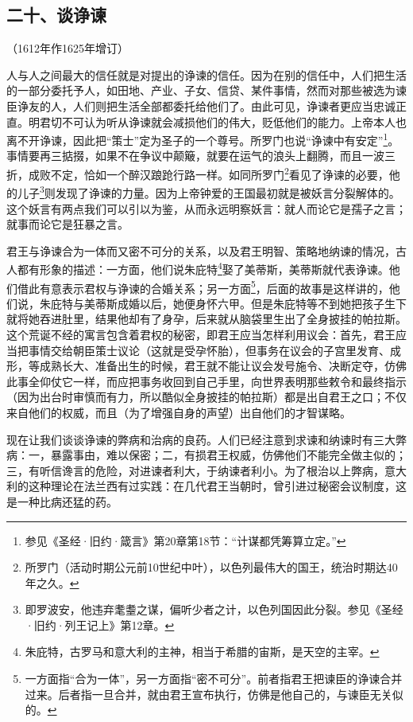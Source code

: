 \subsection*{二十、谈诤谏}
\begin{center}
    （1612年作1625年增订）
\end{center}
\par 人与人之间最大的信任就是对提出的诤谏的信任。因为在别的信任中，人们把生活的一部分委托予人，如田地、产业、子女、信贷、某件事情，然而对那些被选为谏臣诤友的人，人们则把生活全部都委托给他们了。由此可见，诤谏者更应当忠诚正直。明君切不可认为听从诤谏就会减损他们的伟大，贬低他们的能力。上帝本人也离不开诤谏，因此把“策士”定为圣子的一个尊号。所罗门也说“诤谏中有安定”\footnote{参见《圣经·旧约·箴言》第20章第18节：“计谋都凭筹算立定。”}。事情要再三掂掇，如果不在争议中颠簸，就要在运气的浪头上翻腾，而且一波三折，成败不定，恰如一个醉汉踉跄行路一样。如同所罗门\footnote{所罗门（活动时期公元前10世纪中叶），以色列最伟大的国王，统治时期达40年之久。}看见了诤谏的必要，他的儿子\footnote{即罗波安，他违弃耄耋之谋，偏听少者之计，以色列国因此分裂。参见《圣经·旧约·列王记上》第12章。}则发现了诤谏的力量。因为上帝钟爱的王国最初就是被妖言分裂解体的。这个妖言有两点我们可以引以为鉴，从而永远明察妖言：就人而论它是孺子之言；就事而论它是狂暴之言。
\par 君王与诤谏合为一体而又密不可分的关系，以及君王明智、策略地纳谏的情况，古人都有形象的描述：一方面，他们说朱庇特\footnote{朱庇特，古罗马和意大利的主神，相当于希腊的宙斯，是天空的主宰。}娶了美蒂斯，美蒂斯就代表诤谏。他们借此有意表示君权与诤谏的合婚关系；另一方面\footnote{一方面指“合为一体”，另一方面指“密不可分”。前者指君王把谏臣的诤谏合并过来。后者指一旦合并，就由君王宣布执行，仿佛是他自己的，与谏臣无关似的。}，后面的故事是这样讲的，他们说，朱庇特与美蒂斯成婚以后，她便身怀六甲。但是朱庇特等不到她把孩子生下就将她吞进肚里，结果他却有了身孕，后来就从脑袋里生出了全身披挂的帕拉斯。这个荒诞不经的寓言包含着君权的秘密，即君王应当怎样利用议会：首先，君王应当把事情交给朝臣策士议论（这就是受孕怀胎），但事务在议会的子宫里发育、成形，等成熟长大、准备出生的时候，君王就不能让议会发号施令、决断定夺，仿佛此事全仰仗它一样，而应把事务收回到自己手里，向世界表明那些敕令和最终指示（因为出台时审慎而有力，所以酷似全身披挂的帕拉斯）都是出自君王之口；不仅来自他们的权威，而且（为了增强自身的声望）出自他们的才智谋略。
\par 现在让我们谈谈诤谏的弊病和治病的良药。人们已经注意到求谏和纳谏时有三大弊病：一，暴露事由，难以保密；二，有损君王权威，仿佛他们不能完全做主似的；三，有听信谗言的危险，对进谏者利大，于纳谏者利小。为了根治以上弊病，意大利的这种理论在法兰西有过实践：在几代君王当朝时，曾引进过秘密会议制度，这是一种比病还猛的药。
